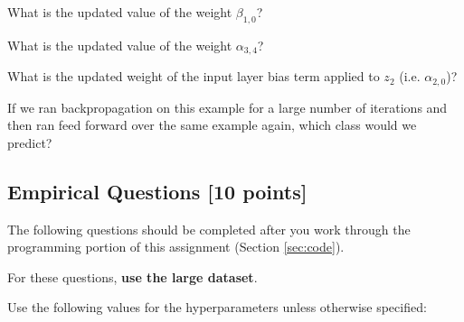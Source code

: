 \documentclass[11pt]{exam}
\numberwithin{equation}{section} %
\numberwithin{figure}{section} %
\numberwithin{table}{section} %
\begin{document}
\begin{enumerate}
\begin{questions}
	        \question[1] What is the updated value of the weight $\beta_{1,0}$?
	        
	        \begin{tcolorbox}[fit,height=1cm, width=2cm, blank, borderline={1pt}{-2pt}]
	        \end{tcolorbox}
	        
	        
	        \question[2] What is the updated value of the weight ${\alpha}_{3,4}$?
	        
	        \begin{tcolorbox}[fit,height=1cm, width=2cm, blank, borderline={1pt}{-2pt}]
	        \end{tcolorbox}
	        
	        
	        \question[2] What is the updated weight of the input layer bias term applied to $z_2$ (i.e. ${\alpha}_{2,0}$)?
	        
	        \begin{tcolorbox}[fit,height=1cm, width=2cm, blank, borderline={1pt}{-2pt}]
	        \end{tcolorbox}
	        
	        
	        \question[1] If we ran backpropagation on this example for a large number of iterations and then ran feed forward over the same example again, which class would we predict?
	        
	        \begin{tcolorbox}[fit,height=1cm, width=2cm, blank, borderline={1pt}{-2pt}]
	        \end{tcolorbox}
	        
	
	    \end{questions}
	
	
	    
	
	 

\end{enumerate}
\clearpage
\subsection{Empirical Questions [10 points]}
\label{sec:interp}

The following questions should be completed after you work through the programming portion of this assignment (Section \ref{sec:code}).

For these questions, \textbf{use the large dataset}.

Use the following values for the hyperparameters unless otherwise specified:
\end{document}
